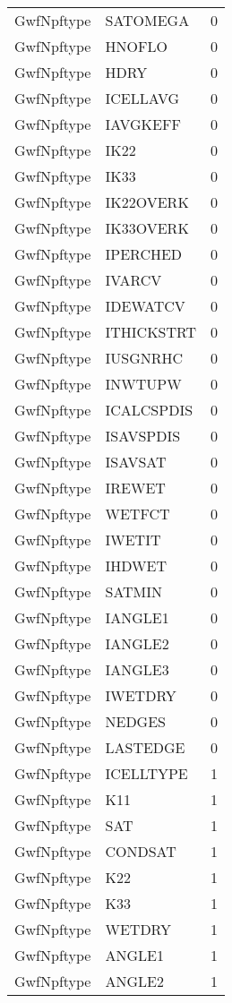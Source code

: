\begin{longtable}{p{6cm} p{4cm} p{2cm} }
GwfNpftype &  SATOMEGA & 0 \\ 
GwfNpftype &  HNOFLO & 0 \\ 
GwfNpftype &  HDRY & 0 \\ 
GwfNpftype &  ICELLAVG & 0 \\ 
GwfNpftype &  IAVGKEFF & 0 \\ 
GwfNpftype &  IK22 & 0 \\ 
GwfNpftype &  IK33 & 0 \\ 
GwfNpftype &  IK22OVERK & 0 \\ 
GwfNpftype &  IK33OVERK & 0 \\ 
GwfNpftype &  IPERCHED & 0 \\ 
GwfNpftype &  IVARCV & 0 \\ 
GwfNpftype &  IDEWATCV & 0 \\ 
GwfNpftype &  ITHICKSTRT & 0 \\ 
GwfNpftype &  IUSGNRHC & 0 \\ 
GwfNpftype &  INWTUPW & 0 \\ 
GwfNpftype &  ICALCSPDIS & 0 \\ 
GwfNpftype &  ISAVSPDIS & 0 \\ 
GwfNpftype &  ISAVSAT & 0 \\ 
GwfNpftype &  IREWET & 0 \\ 
GwfNpftype &  WETFCT & 0 \\ 
GwfNpftype &  IWETIT & 0 \\ 
GwfNpftype &  IHDWET & 0 \\ 
GwfNpftype &  SATMIN & 0 \\ 
GwfNpftype &  IANGLE1 & 0 \\ 
GwfNpftype &  IANGLE2 & 0 \\ 
GwfNpftype &  IANGLE3 & 0 \\ 
GwfNpftype &  IWETDRY & 0 \\ 
GwfNpftype &  NEDGES & 0 \\ 
GwfNpftype &  LASTEDGE & 0 \\ 
GwfNpftype &  ICELLTYPE & 1 \\ 
GwfNpftype &  K11 & 1 \\ 
GwfNpftype &  SAT & 1 \\ 
GwfNpftype &  CONDSAT & 1 \\ 
GwfNpftype &  K22 & 1 \\ 
GwfNpftype &  K33 & 1 \\ 
GwfNpftype &  WETDRY & 1 \\ 
GwfNpftype &  ANGLE1 & 1 \\ 
GwfNpftype &  ANGLE2 & 1 \\ 

\end{longtable}
